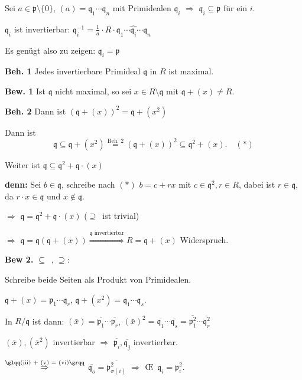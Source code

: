 \begin{Bew}
\begin{description}
Sei $a \in \mathfrak{p}\setminus \{0\}$, $(a) = \mathfrak{q}_1 \cdots \mathfrak{q}_n$ mit Primidealen $\mathfrak{q}_i$ $\Rightarrow$ $\mathfrak{q}_i \subseteq \mathfrak{p}$ f\"ur ein $i$.

$\mathfrak{q}_i$ ist invertierbar: $\mathfrak{q}_i^{-1} = \frac{1}{a} \cdot R \cdot \mathfrak{q}_1 \cdots \widehat{\mathfrak{q}_i} \cdots \mathfrak{q}_n$

Es gen\"ugt also zu zeigen: $\mathfrak{q}_i = \mathfrak{p}$

\textbf{Beh. 1} Jedes invertierbare Primideal $\mathfrak{q}$ in $R$ ist maximal.

\textbf{Bew. 1}
Ist $\mathfrak{q}$ nicht maximal, so sei $x \in R \setminus \mathfrak{q}$ mit $\mathfrak{q} + (x) \neq R$.

\textbf{Beh. 2} Dann ist $(\mathfrak{q} + (x))^2 = \mathfrak{q} + (x^2)$

Dann ist
\[
\mathfrak{q} \subseteq \mathfrak{q} + (x^2) \overset{\text{Beh. 2}}{=}
(\mathfrak{q} + (x))^2 \subseteq \mathfrak{q}^2 + (x).\quad(\ast)
\]

Weiter ist $\mathfrak{q} \subseteq \mathfrak{q}^2 + \mathfrak{q} \cdot (x)$

\textbf{denn:} Sei $b \in \mathfrak{q}$, schreibe nach $(\ast)$ $b = c + r x$ mit $c \in \mathfrak{q}^2, r \in R$, dabei ist $r \in \mathfrak{q}$, da $r \cdot x \in \mathfrak{q}$ und $x \notin \mathfrak{q}$.

$\Rightarrow$ $\mathfrak{q} = \mathfrak{q}^2 + \mathfrak{q} \cdot (x)$ (\glqq$\supseteq$\grqq\ ist trivial)

$\Rightarrow$ $\mathfrak{q} = \mathfrak{q} (\mathfrak{q} + (x)) \overset{\mathfrak{q}\text{ invertierbar}}\Rightarrow R = \mathfrak{q} + (x)$ Widerspruch.

\textbf{Bew 2.} \glqq$\subseteq$\grqq\ \chk, \glqq$\supseteq$\grqq:

Schreibe beide Seiten als Produkt von Primidealen.

$\mathfrak{q} + (x) = \mathfrak{p}_1 \cdots \mathfrak{q}_r$, $\mathfrak{q} + (x^2) = \mathfrak{q}_1 \cdots \mathfrak{q}_s$.

In $R / \mathfrak{q}$ ist dann: $(\bar{x}) = \overline{\mathfrak{p}_1} \cdots \overline{\mathfrak{p}_r}$, $(\bar{x})^2 = \overline{\mathfrak{q}_1} \cdots \overline{\mathfrak{q}_s} = \overline{\mathfrak{p}_1^2} \cdots \overline{\mathfrak{q}_r^2}$

$(\bar{x}), (\bar{x}^2)$ invertierbar $\Rightarrow$ $\overline{\mathfrak{p}_i}, \overline{\mathfrak{q}_j}$ invertierbar.

$\overset{\text{\glqq(iii) + (v) = (vi)\grqq}}{\Rightarrow}$
$\overline{\mathfrak{q}_o} = \overline{\mathfrak{p}_{\sigma(i)}^2}$
$\Rightarrow$ \OE\  $\mathfrak{q}_i = \mathfrak{p}_i^2$.

\end{description}
\end{Bew}

